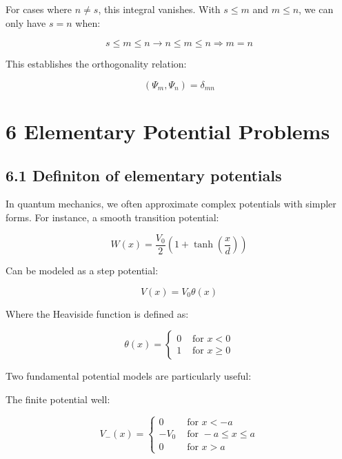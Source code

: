 \documentclass[10pt]{article}
\begin{document}
For cases where $n \neq s$, this integral vanishes. With $s \leq m$ and $m \leq n$, we can only have $s = n$ when:

\begin{equation*}
s \leq m \leq n \rightarrow n \leq m \leq n \Longrightarrow m=n \tag{5.74}
\end{equation*}

This establishes the orthogonality relation:

\begin{equation*}
\left(\Psi_{m}, \Psi_{n}\right)=\delta_{m n} \tag{5.75}
\end{equation*}

\section*{6 Elementary Potential Problems}
\subsection*{6.1 Definiton of elementary potentials}

In quantum mechanics, we often approximate complex potentials with simpler forms. For instance, a smooth transition potential:

\begin{equation*}
W(x)=\frac{V_{0}}{2}\left(1+\tanh \left(\frac{x}{d}\right)\right) \tag{6.1}
\end{equation*}

Can be modeled as a step potential:

\begin{equation*}
V(x)=V_{0} \theta(x) \tag{6.2}
\end{equation*}

Where the Heaviside function is defined as:

\[
\theta(x)= \begin{cases}0 & \text { for } x<0  \tag{6.3}\\ 1 & \text { for } x \geq 0\end{cases}
\]

Two fundamental potential models are particularly useful:

The finite potential well:

\[
V_{-}(x)= \begin{cases}0 & \text { for } x<-a  \tag{6.4}\\ -V_{0} & \text { for }-a \leq x \leq a \\ 0 & \text { for } x>a\end{cases}
\]
\end{document}
